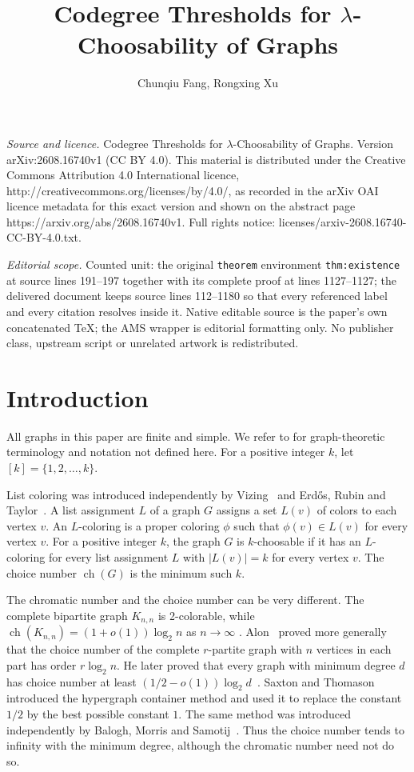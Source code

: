 \documentclass[10pt,a4paper]{amsart}
\numberwithin{equation}{section}
\begin{document}
\title[Codegree Thresholds for lambda-Choosability of Graphs]{Codegree Thresholds for $\lambda$-Choosability of Graphs}
\author{Chunqiu Fang, Rongxing Xu}
\date{}
\maketitle
\noindent\emph{Source and licence.} Codegree Thresholds for $\lambda$-Choosability of Graphs. Version arXiv:2608.16740v1 (CC BY 4.0). This material is distributed under the Creative Commons Attribution 4.0 International licence, http://creativecommons.org/licenses/by/4.0/, as recorded in the arXiv OAI licence metadata for this exact version and shown on the abstract page https://arxiv.org/abs/2608.16740v1. Full rights notice: licenses/arxiv-2608.16740-CC-BY-4.0.txt.\par\smallskip
\noindent\textit{Editorial scope.} Counted unit: the original \texttt{theorem} environment \texttt{thm:existence} at source lines 191--197 together with its complete proof at lines 1127--1127; the delivered document keeps source lines 112--1180 so that every referenced label and every citation resolves inside it. Native editable source is the paper's own concatenated TeX; the AMS wrapper is editorial formatting only. No publisher class, upstream script or unrelated artwork is redistributed.
\section{Introduction}

All graphs in this paper are finite and simple. We refer to \cite{BondyMurty2008} for graph-theoretic terminology and notation not defined here. For a positive integer $k$, let $[k]=\{1,2,\ldots,k\}$.

List coloring was introduced independently by Vizing~\cite{Vizing1976} and
Erd\H{o}s, Rubin and Taylor~\cite{ERT1979}. A list assignment $L$ of a graph
$G$ assigns a set $L(v)$ of colors to each vertex $v$. An $L$-coloring is a
proper coloring $\phi$ such that $\phi(v) \in L(v)$ for every vertex $v$. For a
positive integer $k$, the graph $G$ is $k$-choosable if it has an $L$-coloring
for every list assignment $L$ with $|L(v)| = k$ for every vertex $v$. The choice
number $\operatorname{ch}(G)$ is the minimum such $k$.

The chromatic number and the choice number can be very different. The complete
bipartite graph $K_{n,n}$ is 2-colorable, while
$\operatorname{ch}(K_{n,n}) = (1 + o(1))\log_2 n$ as $n \to \infty$
\cite{ERT1979}. Alon~\cite{Alon1992} proved more generally that the choice
number of the complete $r$-partite graph with $n$ vertices in each part has
order $r\log_2 n$. He later proved that every graph with minimum degree $d$ has choice
number at least $(1/2 - o(1))\log_2 d$~\cite{Alon2000}. Saxton and
Thomason~\cite{ST2015} introduced the hypergraph container method and used it
to replace the constant $1/2$ by the best possible constant $1$. The same
method was introduced independently by Balogh, Morris and
Samotij~\cite{BMS2015}. Thus the choice number tends to infinity with the
minimum degree, although the chromatic number need not do so.
\end{document}
